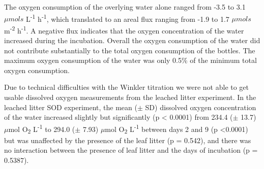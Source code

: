 The oxygen consumption of the overlying water alone ranged from -3.5 to 3.1 $\mu mols$ L\textsuperscript{-1} h\textsuperscript{-1}, which translated to an areal flux ranging from -1.9 to 1.7 $\mu mols$ m\textsuperscript{-2} h\textsuperscript{-1}. A negative flux indicates that the oxygen concentration of the water increased during the incubation. Overall the oxygen consumption of the water did not contribute substantially to the total oxygen consumption of the bottles. The maximum oxygen consumption of the water was only 0.5\% of the minimum total oxygen consumption.  

Due to technical difficulties with the Winkler titration we were not able to get usable dissolved oxygen measurements from the leached litter experiment. In the leached litter SOD experiment, the mean ($\pm$ SD) dissolved oxygen concentration of the water increased slightly but significantly (p < 0.0001) from 234.4 ($\pm$ 13.7) $\mu$mol O\textsubscript{2} L\textsuperscript{-1} to 294.0 ($\pm$ 7.93) $\mu$mol O\textsubscript{2} L\textsuperscript{-1} between days 2 and 9 (p <0.0001) but was unaffected by the presence of the leaf litter (p = 0.542), and there was no interaction between the presence of leaf litter and the days of incubation (p = 0.5387).